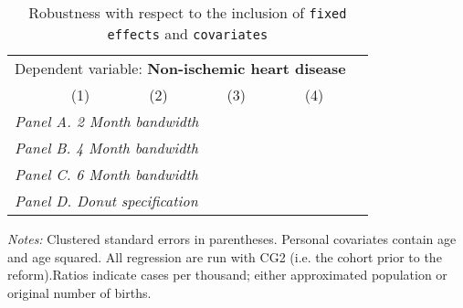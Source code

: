  \begin{table}[H] \begin{threeparttable} \centering \caption{Robustness with respect to the inclusion of \texttt{fixed effects} and \texttt{covariates}} {\def\sym#1{\ifmmode^{#1}\else\(^{#1}\)\fi} \begin{tabular}{l*{5}{c}} \toprule \multicolumn{5}{c}{Dependent variable: \textbf{Non-ischemic heart disease}} \\ \cmidrule(lr){2-5}
            &\multicolumn{1}{c}{(1)}&\multicolumn{1}{c}{(2)}&\multicolumn{1}{c}{(3)}&\multicolumn{1}{c}{(4)}\\
\midrule
 \multicolumn{5}{l}{\emph{Panel A. 2 Month bandwidth}} \\    \midrule\multicolumn{5}{l}{\emph{Panel B. 4 Month bandwidth}} \\    \midrule\multicolumn{5}{l}{\emph{Panel C. 6 Month bandwidth}} \\    \midrule\multicolumn{5}{l}{\emph{Panel D. Donut specification}} \\    \midrule  
\bottomrule \end{tabular} } \begin{tablenotes} \item \scriptsize \emph{Notes:} Clustered standard errors in parentheses. Personal covariates contain age and age squared. All regression are run with CG2 (i.e. the cohort prior to the reform).Ratios indicate cases per thousand; either approximated population or original number of births. \end{tablenotes} \end{threeparttable} \end{table} 
